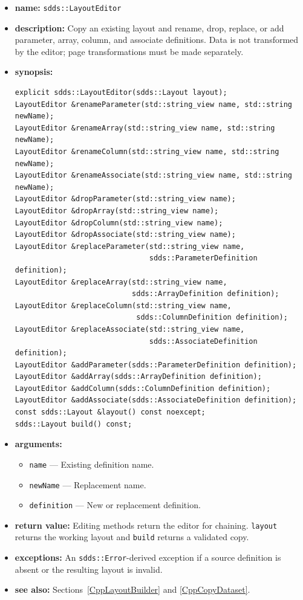 \documentclass[11pt]{article}
\begin{document}
\begin{itemize}
\item {\bf name:}\newline
{\tt sdds::LayoutEditor}
\item {\bf description:}\newline
Copy an existing layout and rename, drop, replace, or add parameter, array,
column, and associate definitions.  Data is not transformed by the editor;
page transformations must be made separately.
\item {\bf synopsis:}
\begin{verbatim}
explicit sdds::LayoutEditor(sdds::Layout layout);
LayoutEditor &renameParameter(std::string_view name, std::string newName);
LayoutEditor &renameArray(std::string_view name, std::string newName);
LayoutEditor &renameColumn(std::string_view name, std::string newName);
LayoutEditor &renameAssociate(std::string_view name, std::string newName);
LayoutEditor &dropParameter(std::string_view name);
LayoutEditor &dropArray(std::string_view name);
LayoutEditor &dropColumn(std::string_view name);
LayoutEditor &dropAssociate(std::string_view name);
LayoutEditor &replaceParameter(std::string_view name,
                               sdds::ParameterDefinition definition);
LayoutEditor &replaceArray(std::string_view name,
                           sdds::ArrayDefinition definition);
LayoutEditor &replaceColumn(std::string_view name,
                            sdds::ColumnDefinition definition);
LayoutEditor &replaceAssociate(std::string_view name,
                               sdds::AssociateDefinition definition);
LayoutEditor &addParameter(sdds::ParameterDefinition definition);
LayoutEditor &addArray(sdds::ArrayDefinition definition);
LayoutEditor &addColumn(sdds::ColumnDefinition definition);
LayoutEditor &addAssociate(sdds::AssociateDefinition definition);
const sdds::Layout &layout() const noexcept;
sdds::Layout build() const;
\end{verbatim}
\item {\bf arguments:}
\begin{itemize}
\item {\tt name} --- Existing definition name.
\item {\tt newName} --- Replacement name.
\item {\tt definition} --- New or replacement definition.
\end{itemize}
\item {\bf return value:}\newline
Editing methods return the editor for chaining.  {\tt layout} returns the
working layout and {\tt build} returns a validated copy.
\item {\bf exceptions:}\newline
An {\tt sdds::Error}-derived exception if a source definition is absent or the
resulting layout is invalid.
\item {\bf see also:}\newline
Sections~\ref{CppLayoutBuilder} and \ref{CppCopyDataset}.
\end{itemize}
\end{document}
